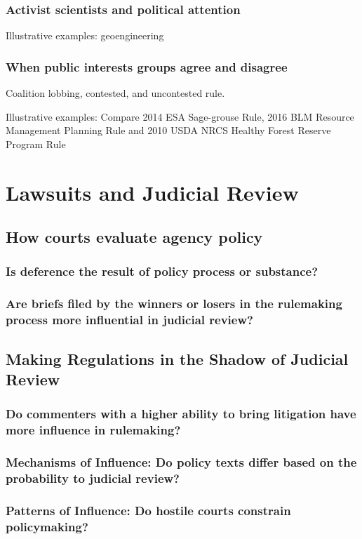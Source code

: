 \subsubsection{Activist scientists and political attention}
Illustrative examples: geoengineering
\subsubsection{When public interests groups agree and disagree}
Coalition lobbing, contested, and uncontested rule.

Illustrative examples: Compare 2014 ESA Sage-grouse Rule, 2016 BLM Resource Management Planning Rule and 2010 USDA NRCS Healthy Forest Reserve Program Rule

\section{Lawsuits and Judicial Review}

\subsection{How courts evaluate agency policy}
\subsubsection{Is deference the result of policy process or substance?}
\subsubsection{Are briefs filed by the winners or losers in the rulemaking process more influential in judicial review?}
\subsection{Making Regulations in the Shadow of Judicial Review}
\subsubsection{Do commenters with a higher ability to bring litigation have more influence in rulemaking?}
\subsubsection{Mechanisms of Influence: Do policy texts differ based on the probability to judicial review?}
\subsubsection{Patterns of Influence: Do hostile courts constrain policymaking?}




